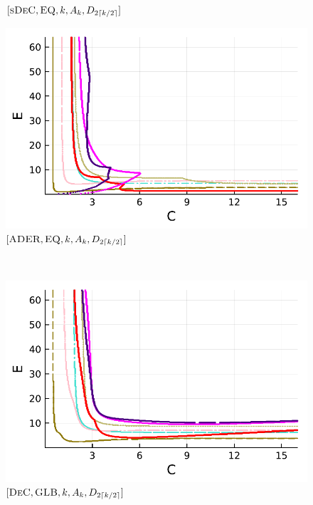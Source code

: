 \begin{figure}
\begin{minipage}[t]{0.32\textwidth}
		\centering
		$[\textsc{sDeC},\textsc{EQ}, k, A_k,D_{2\lceil k/2 \rceil}]$
	\end{minipage}
	\begin{minipage}[t]{0.32\textwidth}
		\includegraphics[width=\textwidth]{pdf/pdepics/diff/IMEXADER_equispaced_all_2-8.pdf}
		\centering
		$[\textsc{ADER},\textsc{EQ}, k, A_k,D_{2\lceil k/2 \rceil}]$
	\end{minipage}\\
	\begin{minipage}[t]{0.32\textwidth}
		\includegraphics[width=\textwidth]{pdf/pdepics/diff/IMEXDeC_gaussLobatto_all_2-8.pdf}
		\centering
		$[\textsc{DeC},\textsc{GLB}, k, A_k,D_{2\lceil k/2 \rceil}]$
	\end{minipage} 
	\begin{minipage}[t]{0.32\textwidth}

\end{minipage}
\end{figure}

